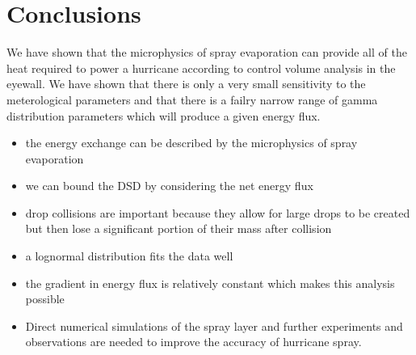 \documentclass[10pt,a4paper]{article}
\begin{document}
\newpage
\section{Conclusions}
We have shown that the microphysics of spray evaporation can provide all of the heat required to power a hurricane according to control volume analysis in the eyewall. We have shown that there is only a very small sensitivity to the meterological parameters and that there is a failry narrow range of gamma distribution parameters which will produce a given energy flux.

\begin{itemize}
\item
the energy exchange can be described by the microphysics of spray evaporation
\item
we can bound the DSD by considering the net energy flux
\item
drop collisions are important because they allow for large drops to be created but then lose a significant portion of their mass after collision
\item
a lognormal distribution fits the data well
\item
the gradient in energy flux is relatively constant which makes this analysis possible
\item
Direct numerical simulations of the spray layer and further experiments and observations are needed to improve the accuracy of hurricane spray. 
\end{itemize}







\end{document}
